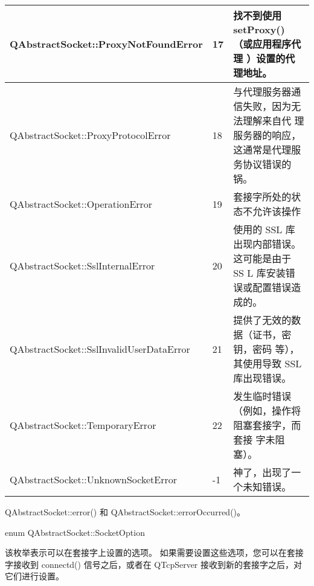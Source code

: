 \begin{longtable}[l]{|m{29em}|m{2em}|m{19em}|}
\hline
QAbstractSocket::ProxyNotFoundError&	17&	找不到使用 setProxy() （或应用程序代理
）设置的代理地址。\\
\hline
QAbstractSocket::ProxyProtocolError&	18&	与代理服务器通信失败，因为无法理解来自代
理服务器的响应，这通常是代理服务协议错误的锅。\\
\hline
QAbstractSocket::OperationError&	19&	套接字所处的状态不允许该操作\\
\hline
QAbstractSocket::SslInternalError&	20&	使用的 SSL 库出现内部错误。 这可能是由于 SS
L 库安装错误或配置错误造成的。\\
\hline
QAbstractSocket::SslInvalidUserDataError&	21&	提供了无效的数据（证书，密钥，密码
等），其使用导致 SSL 库出现错误。\\
\hline
QAbstractSocket::TemporaryError&	22&	发生临时错误（例如，操作将阻塞套接字，而套接
字未阻塞）。\\
\hline
QAbstractSocket::UnknownSocketError&	-1&	神了，出现了一个未知错误。\\
\hline
\end{longtable}

\begin{seeAlso}
QAbstractSocket::error() 和 QAbstractSocket::errorOccurred()。
\end{seeAlso}


\splitLine

enum QAbstractSocket::SocketOption

该枚举表示可以在套接字上设置的选项。 如果需要设置这些选项，您可以在套接字接收到 connectd() 信号之后，或者在 QTcpServer 接收到新的套接字之后，对它们进行设置。


